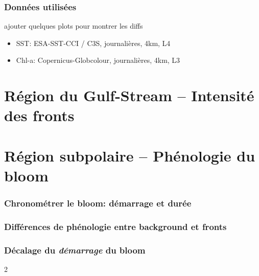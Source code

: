 
\begin{frame}
  \frametitle{Données utilisées}

  ajouter quelques plots pour montrer les diffs

  \begin{itemize}
    \item SST: ESA-SST-CCI / C3S, journalières, 4km, L4
    \item Chl-a: Copernicus-Globcolour, journalières, 4km, L3
  \end{itemize}

\end{frame}


\section{Région du Gulf-Stream -- Intensité des fronts}

\section{Région subpolaire -- Phénologie du bloom}


\begin{frame}
  \frametitle{Chronométrer le bloom: démarrage et durée}
\end{frame}


\begin{frame}
  \frametitle{Différences de phénologie entre background et fronts}
\end{frame}


\begin{frame}
  \frametitle{Décalage du \emph{\textit{démarrage}} du bloom}

  \vfill

  \begin{overlayarea}{\textwidth}{2\baselineskip}

  \end{overlayarea}
\end{frame}

